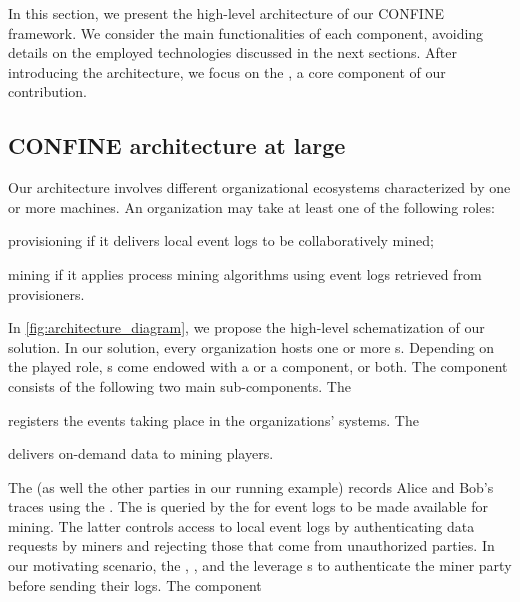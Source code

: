
In this section, we present the high-level architecture of our CONFINE framework. We consider the main functionalities of each component, avoiding details on the employed technologies discussed in the next sections. After introducing the architecture, we focus on the , a core component of our contribution.

\subsection{CONFINE architecture at large}
Our architecture involves different organizational ecosystems characterized by one or more machines. An organization may take at least one of the following roles: 
\begin{inparadesc}
\item[provisioning] if it delivers local event logs to be collaboratively mined;
\item[mining] if it applies process mining algorithms using event logs retrieved from provisioners.
\end{inparadesc}
In \cref{fig:architecture_diagram}, we propose the high-level schematization of our solution.
In our solution, every organization hosts one or more s. Depending on the played role, s come endowed with a  or a  component, or both. The  component consists of the following two main sub-components. The \begin{inparadesc}
\item[\Compo{Log Recorder}] registers the events taking place in the organizations' systems. The
\item[\Compo{Log Provider}] delivers on-demand data to mining players.
\end{inparadesc}
The  (as well the other parties in our running example) records Alice and Bob's traces using the . The  is queried by the  for event logs to be made available for mining. The latter controls access to local event logs by authenticating data requests by miners and rejecting those that come from unauthorized parties.
In our motivating scenario, the , , and the  leverage s to authenticate the miner party before sending their logs.  The  component
